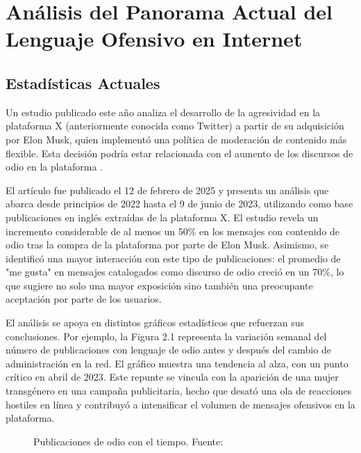 \chapter{Análisis del Panorama Actual del Lenguaje Ofensivo en Internet}

\section{Estadísticas Actuales}

Un estudio publicado este año analiza el desarrollo de la agresividad en la plataforma X (anteriormente conocida como Twitter) a partir de su adquisición por Elon Musk, quien implementó una política de moderación de contenido más flexible. Esta decisión podría estar relacionada con el aumento de los discursos de odio en la plataforma \cite{hickey2025x}.

El artículo fue publicado el 12 de febrero de 2025 y presenta un análisis que abarca desde principios de 2022 hasta el 9 de junio de 2023, utilizando como base publicaciones en inglés extraídas de la plataforma X. El estudio revela un incremento considerable de al menos un 50\% en los mensajes con contenido de odio tras la compra de la plataforma por parte de Elon Musk. Asimismo, se identificó una mayor interacción con este tipo de publicaciones: el promedio de "me gusta" en mensajes catalogados como discurso de odio creció en un 70\%, lo que sugiere no solo una mayor exposición sino también una preocupante aceptación por parte de los usuarios.

El análisis se apoya en distintos gráficos estadísticos que refuerzan sus conclusiones. Por ejemplo, la Figura 2.1 representa la variación semanal del número de publicaciones con lenguaje de odio antes y después del cambio de administración en la red. El gráfico muestra una tendencia al alza, con un punto crítico en abril de 2023. Este repunte se vincula con la aparición de una mujer transgénero en una campaña publicitaria, hecho que desató una ola de reacciones hostiles en línea y contribuyó a intensificar el volumen de mensajes ofensivos en la plataforma.









\vspace{0.5cm}

\begin{figure}[h!]
    \centering
    \caption{Publicaciones de odio con el tiempo. Fuente: \cite{hickey2025x}}
\end{figure}

